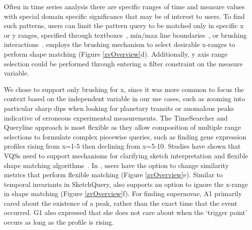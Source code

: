  Often in time series analysis there are specific ranges of time and measure values with special domain specific significance that may be of interest to users. To find such patterns, users can limit the pattern query to be matched only in specific x or y ranges, specified through textboxes~\cite{wattenberg2001sketching,Mannino2018}, min/max line boundaries~\cite{ryall2005querylines}, or brushing interactions~\cite{Hochheiser2001}. \zv employs the brushing mechanism to select desirable x-ranges to perform shape matching (Figure \ref{zvOverview}d). Additionally, y axis range selection could be performed through entering a filter constraint on the measure variable.
\par We chose to support only brushing for x, since it was more common to focus the context based on the independent variable in our use cases, such as zooming into particular sharp dips when looking for planetary transits or anomalous peaks indicative of erroneous experimental measurements.  The TimeSearcher and Queryline approach is most flexible as they allow composition of multiple range selections to formulate complex piecewise queries, such as finding gene expression profiles rising from x=1-5 then declining from x=5-10.
 Studies have shown that  VQSs need to support mechanisms for clarifying sketch interpretation and flexible shape matching algorithms~\cite{correll2016semantics,Mannino2018,Eichmann2015}. In \zv, users have the option to change similarity metrics that perform flexible matching (Figure \ref{zvOverview}e). Similar to temporal invariants in SketchQuery, \zv also supports an option to ignore the x-range in shape matching (Figure \ref{zvOverview}f). For finding supernovae, A1 primarily cared about the existence of a peak, rather than the exact time that the event occurred. G1 also expressed that she does not care about when the `trigger point' occurs as long as the profile is rising.

